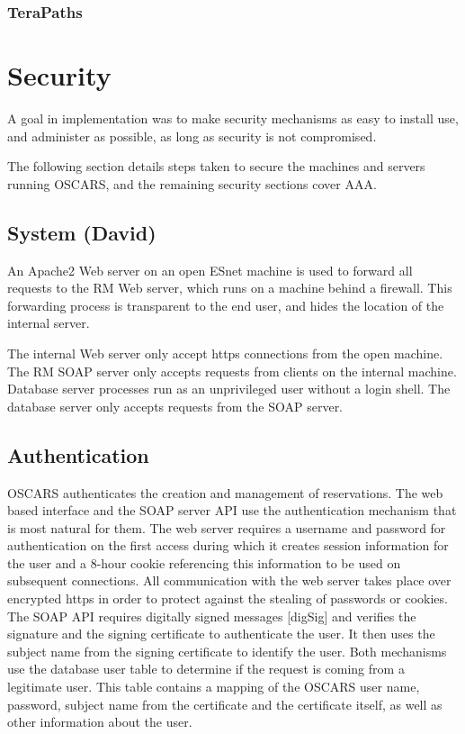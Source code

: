 \documentclass[conference]{IEEEtran}
\begin{document}
\subsubsection{TeraPaths}


\section{Security}
A goal in implementation was to make security mechanisms as easy to install
use, and administer as possible, as long as security is not compromised.

The following section details steps taken to secure the machines and 
servers running OSCARS, and the remaining security sections cover AAA.

\subsection{System (David)}

An Apache2 Web server on an open ESnet machine is used to forward all 
requests to the RM Web server, which runs on a machine behind a firewall. 
This forwarding process is transparent to the end user, and hides the location 
of the internal server.

The internal Web server only accept https connections from the open machine.
The RM SOAP server only accepts requests from clients on the internal machine. 
Database server processes run as an unprivileged user without a login 
shell.  The database server only accepts requests from the SOAP server.


\subsection{Authentication}
OSCARS authenticates the creation and management of
reservations. The web based interface and the SOAP server API use the
authentication mechanism that is most natural for them. The web server
requires a username and password for authentication on the first
access during which it creates session information for the user and a
8-hour cookie referencing this information to be used on subsequent
connections. All communication with the web server takes place over
encrypted https in order to protect against the stealing of passwords
or cookies. The SOAP API requires digitally signed messages [digSig]
and verifies the signature and the signing certificate to authenticate
the user. It then uses the subject name from the signing certificate
to identify the user. Both mechanisms use the database user table to
determine if the request is coming from a legitimate user. This table
contains a mapping of the OSCARS user name, password, subject name
from the certificate and the certificate itself, as well as other
information about the user.
\end{document}

